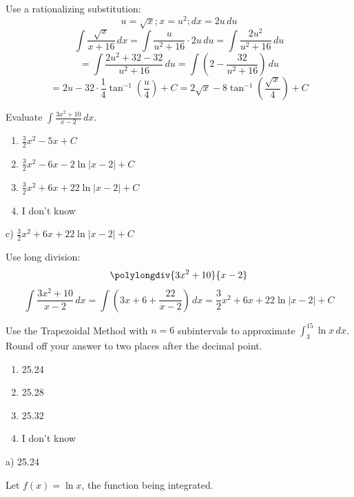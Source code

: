 \documentclass[addpoints,12pt,answers]{exam}
\begin{document}
\begin{questions}
\begin{solution}
    Use a rationalizing substitution:
    $$u=\sqrt{x}; x=u^2; dx=2u\,du$$
    $$\int\frac{\sqrt{x}}{x+16}\,dx=\int\frac{u}{u^2+16}\cdot 2u\,du=\int\frac{2u^2}{u^2+16}\,du$$
    $$=\int\frac{2u^2+32-32}{u^2+16}\,du=\int\left(2-\frac{32}{u^2+16}\right)\,du$$
    $$=2u-32\cdot\frac{1}{4}\tan^{-1}\left(\frac{u}{4}\right)+C=2\sqrt{x}-8\tan^{-1}\left(\frac{\sqrt{x}}{4}\right)+C$$
  \end{solution}
  \newpage
  \question
  Evaluate $\displaystyle\int\frac{3x^2+10}{x-2}\,dx$.
  \begin{enumerate}[label=\alph*)]
    \item
    $\displaystyle\frac{3}{2}x^2-5x+C$
    \item
    $\displaystyle\frac{3}{2}x^2-6x-2\ln|x-2|+C$
    \item
    $\displaystyle\frac{3}{2}x^2+6x+22\ln|x-2|+C$
    \item
    I don't know
  \end{enumerate}
  \begin{solution}
    c) $\displaystyle\frac{3}{2}x^2+6x+22\ln|x-2|+C$
    
    Use long division:
    $$\polylongdiv{3x^2+10}{x-2}$$
    $$\int\frac{3x^2+10}{x-2}\,dx=\int\left(3x+6+\frac{22}{x-2}\right)\,dx=\frac{3}{2}x^2+6x+22\ln|x-2|+C$$
  \end{solution}
  \newpage
  \question
  Use the Trapezoidal Method with $n=6$ subintervals to approximate $\displaystyle\int_3^{15}\ln x\,dx$. Round off your answer to two places after the decimal point.
  \begin{enumerate}[label=\alph*)]
    \item
    25.24
    \item
    25.28
    \item
    25.32
    \item
    I don't know
  \end{enumerate}
  \begin{solution}
    a) 25.24
    
    Let $f(x)=\ln x$, the function being integrated.
    

\end{solution}
\end{questions}
\end{document}
